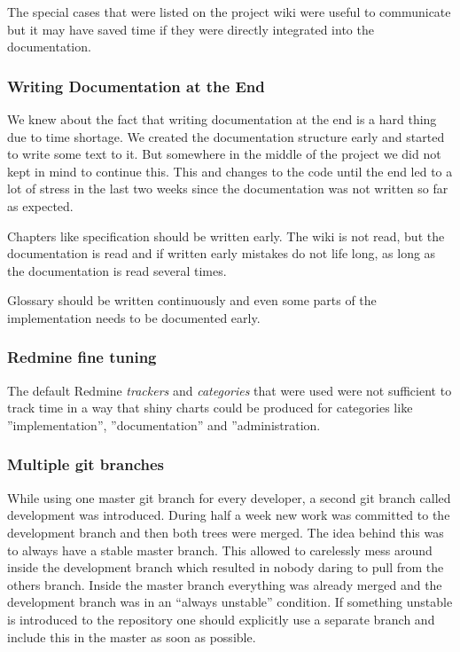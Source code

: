 The special cases that were listed on the project wiki were useful to 
communicate but it may have saved time if they were directly integrated into 
the documentation.

\subsubsection*{Writing Documentation at the End}

We knew about the fact that writing documentation at the end is a hard thing
due to time shortage. We created the documentation structure early and started
to write some text to it. But somewhere in the middle of the project we did not
kept in mind to continue this. This and changes to the code until the end led
to a lot of stress in the last two weeks since the documentation was not
written so far as expected.

Chapters like specification should be written early. The wiki is not read, but
the documentation is read and if written early mistakes do not life long, as
long as the documentation is read several times.

Glossary should be written continuously and even some parts of the
implementation needs to be documented early.

\subsubsection*{Redmine fine tuning}

The default Redmine \textit{trackers} and \textit{categories} that were used 
were not sufficient to track time in a way that shiny charts could be produced 
for categories like ''implementation'', ''documentation'' and ''administration. 

\subsubsection*{Multiple git branches}

While using one master git branch for every developer, a second git branch 
called development was introduced. During half a week new work was committed to
the
development branch and then both trees were merged. The idea behind this was to
always have a stable master branch. This allowed to carelessly mess around
inside the development branch which resulted in nobody daring
to pull from the others branch. Inside the master branch everything was already
merged and
the development branch was in an ``always unstable'' condition.
If something unstable is introduced to the repository one should explicitly use
a separate branch and include this in the master as soon as possible.